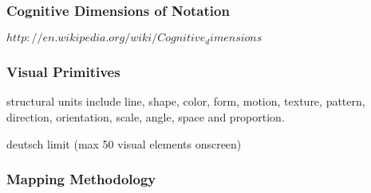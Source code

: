 \subsubsection{Cognitive Dimensions of Notation}
$http://en.wikipedia.org/wiki/Cognitive_dimensions$

\subsubsection{Visual Primitives}

structural units include line, shape, color, form, motion, texture, pattern, direction, orientation, scale, angle, space and proportion.

deutsch limit (max 50 visual elements onscreen)

\subsubsection{Mapping Methodology}


